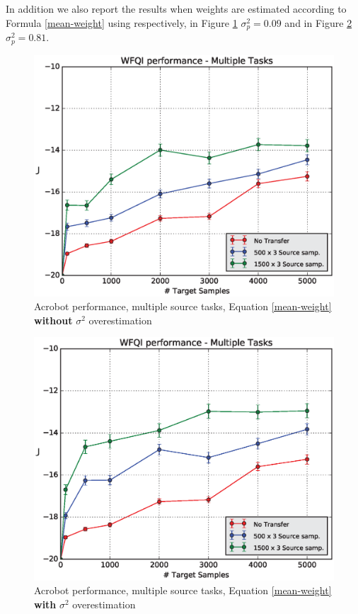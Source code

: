     \noindent In addition we also report the results when weights are estimated according to
    Formula \ref{mean-weight} using respectively, in Figure \ref{acro-mean-res1}
    $\sigma^{2}_{p} = 0.09$ and in Figure \ref{acro-mean-res2} $\sigma^{2}_{p} = 0.81$.

    \begin{figure}[H]
      \centering
      \includegraphics[scale=0.5]{images/WFQIPerfM_acro_MEAN.eps}
      \caption{Acrobot performance, multiple source tasks, Equation \ref{mean-weight} \textbf{without} $\sigma^{2}$ overestimation}
      \label{acro-mean-res1}
    \end{figure}

    \begin{figure}[H]
      \centering
      \includegraphics[scale=0.5]{images/WFQIPerfM_acro_MEAN2.eps}
      \caption{Acrobot performance, multiple source tasks, Equation \ref{mean-weight} \textbf{with} $\sigma^{2}$ overestimation}
      \label{acro-mean-res2}
    \end{figure}

